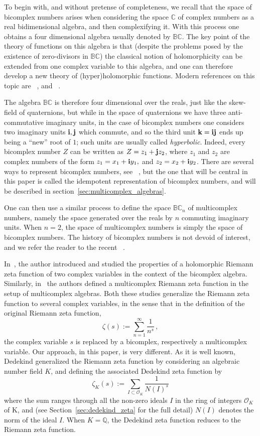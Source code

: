 \documentclass[reqno]{amsart}
\theoremstyle{plain}
\theoremstyle{definition}
\theoremstyle{remark}
\numberwithin{equation}{section}
\begin{document}
To begin with, and without pretense of completeness, we recall that
the space of bicomplex numbers arises when considering the space
$\mathbb{C}$ of complex numbers as a real bidimensional algebra, and
then complexifying it. With this process one obtains a four
dimensional algebra usually denoted by ${{\mathbb B}{\mathbb C}}$. The key point of the
theory of functions on this algebra is that (despite the problems
posed by the existence of zero-divisors in ${{\mathbb B}{\mathbb C}}$) the classical notion
of holomorphicity can be extended from one complex variable to this
algebra, and one can therefore develop a new theory of
(hyper)holomorphic functions. Modern references on this topic are
~\cite{alss}, and ~\cite{bicomplexbook}.

The algebra ${{\mathbb B}{\mathbb C}}$ is therefore four dimensional over the reals, just
like the skew-field of quaternions, but while in the space of
quaternions we have three anti-commutative imaginary units, in the
case of bicomplex numbers one considers two imaginary units ${{\bf i}},{{\bf j}}$
which commute, and so the third unit ${{\bf k}}={{\bf i}}{{\bf j}}$ ends up being a ``new''
root of $1$; such units are usually called {\em hyperbolic}. Indeed,
every bicomplex number $Z$ can be written as $Z=z_1+{{\bf j}} z_2$, where
$z_1$ and $z_2$ are complex numbers of the form $z_1=x_1+{{\bf i}} y_1,$ and
$z_2=x_2+{{\bf i}} y_2$.  There are several ways to represent bicomplex
numbers, see ~\cite{bicomplexbook}, but the one that will be central
in this paper is called the idempotent representation of bicomplex
numbers, and will be described in
section~\ref{sec:multicomplex_algebras}.

One can then use a similar process to define the space ${{\mathbb B}{\mathbb C}}_n$ of
multicomplex numbers, namely the space generated over the reals by $n$
commuting imaginary units. When $n=2$, the space of multicomplex
numbers is simply the space of bicomplex numbers. The history of
bicomplex numbers is not devoid of interest, and we refer the reader
to the recent ~\cite{cerroni}.

In~\cite{rochon_zeta}, the author introduced and studied the
properties of a holomorphic Riemann zeta function of two complex
variables in the context of the bicomplex algebra. Similarly,
in~\cite{reid} the authors defined a multicomplex Riemann zeta
function in the setup of multicomplex algebras. Both these studies
generalize the Riemann zeta function to several complex variables, in
the sense that in the definition of the original Riemann zeta
function,
$$
\zeta(s) := \sum_{n=1}^\infty \frac{1}{n^s}\,,
$$
the complex variable $s$ is replaced by a bicomplex, respectively a
multicomplex variable. Our approach, in this paper, is very
different. As it is well known, Dedekind generalized the Riemann zeta
function by considering an algebraic number field $K$, and defining
the associated Dedekind zeta function by
$$
\zeta_K(s):=\sum_{I \subset \mathcal{O}_K} \frac{1}{N(I)^s}
$$
where the sum ranges through all the non-zero ideals $I$ in the ring
of integers $\mathcal{O}_K$ of K, and (see
Section~\ref{sec:dedekind_zeta} for the full detail) $N(I)$ denotes
the norm of the ideal $I$. When $K=\mathbb{Q}$, the Dedekind zeta
function reduces to the Riemann zeta function.
\end{document}
